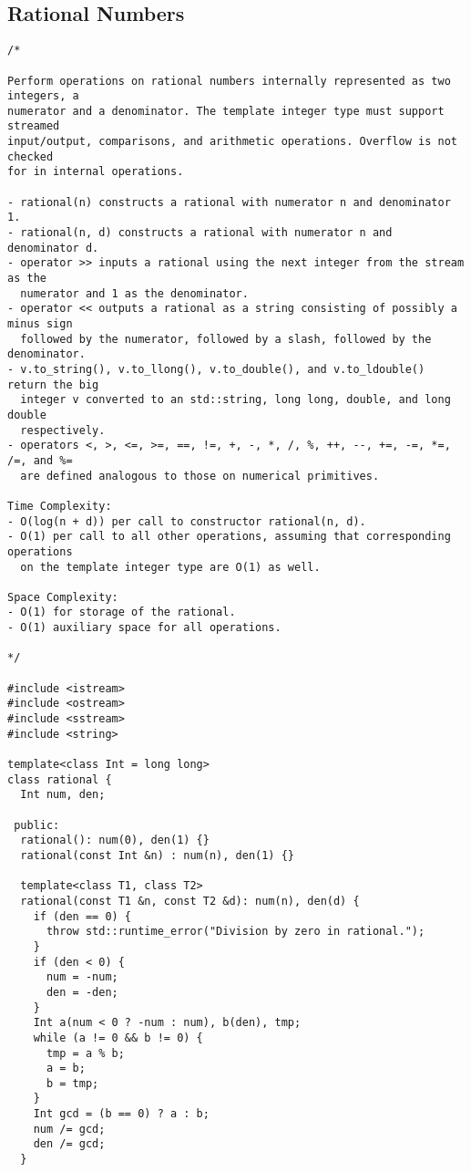 \subsection{Rational Numbers}
\begin{lstlisting}
/*

Perform operations on rational numbers internally represented as two integers, a
numerator and a denominator. The template integer type must support streamed
input/output, comparisons, and arithmetic operations. Overflow is not checked
for in internal operations.

- rational(n) constructs a rational with numerator n and denominator 1.
- rational(n, d) constructs a rational with numerator n and denominator d.
- operator >> inputs a rational using the next integer from the stream as the
  numerator and 1 as the denominator.
- operator << outputs a rational as a string consisting of possibly a minus sign
  followed by the numerator, followed by a slash, followed by the denominator.
- v.to_string(), v.to_llong(), v.to_double(), and v.to_ldouble() return the big
  integer v converted to an std::string, long long, double, and long double
  respectively.
- operators <, >, <=, >=, ==, !=, +, -, *, /, %, ++, --, +=, -=, *=, /=, and %=
  are defined analogous to those on numerical primitives.

Time Complexity:
- O(log(n + d)) per call to constructor rational(n, d).
- O(1) per call to all other operations, assuming that corresponding operations
  on the template integer type are O(1) as well.

Space Complexity:
- O(1) for storage of the rational.
- O(1) auxiliary space for all operations.

*/

#include <istream>
#include <ostream>
#include <sstream>
#include <string>

template<class Int = long long>
class rational {
  Int num, den;

 public:
  rational(): num(0), den(1) {}
  rational(const Int &n) : num(n), den(1) {}

  template<class T1, class T2>
  rational(const T1 &n, const T2 &d): num(n), den(d) {
    if (den == 0) {
      throw std::runtime_error("Division by zero in rational.");
    }
    if (den < 0) {
      num = -num;
      den = -den;
    }
    Int a(num < 0 ? -num : num), b(den), tmp;
    while (a != 0 && b != 0) {
      tmp = a % b;
      a = b;
      b = tmp;
    }
    Int gcd = (b == 0) ? a : b;
    num /= gcd;
    den /= gcd;
  }


\end{lstlisting}
